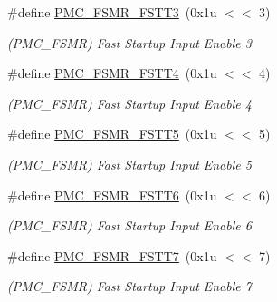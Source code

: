 \begin{DoxyCompactItemize}
\#define \mbox{\hyperlink{group__SAMV71__PMC_ga209ebf830fe0d38dec72a4157c8c0285}{P\+M\+C\+\_\+\+F\+S\+M\+R\+\_\+\+F\+S\+T\+T3}}~(0x1u $<$$<$ 3)
\begin{DoxyCompactList}\small\item\em (P\+M\+C\+\_\+\+F\+S\+MR) Fast Startup Input Enable 3 \end{DoxyCompactList}\item 
\mbox{\label{group__SAMV71__PMC_ga6ca1b1aa6cc30dfe611abc2f68c1225f}} 
\#define \mbox{\hyperlink{group__SAMV71__PMC_ga6ca1b1aa6cc30dfe611abc2f68c1225f}{P\+M\+C\+\_\+\+F\+S\+M\+R\+\_\+\+F\+S\+T\+T4}}~(0x1u $<$$<$ 4)
\begin{DoxyCompactList}\small\item\em (P\+M\+C\+\_\+\+F\+S\+MR) Fast Startup Input Enable 4 \end{DoxyCompactList}\item 
\mbox{\label{group__SAMV71__PMC_ga9bac35f07a6ff0faaf033f61b161f936}} 
\#define \mbox{\hyperlink{group__SAMV71__PMC_ga9bac35f07a6ff0faaf033f61b161f936}{P\+M\+C\+\_\+\+F\+S\+M\+R\+\_\+\+F\+S\+T\+T5}}~(0x1u $<$$<$ 5)
\begin{DoxyCompactList}\small\item\em (P\+M\+C\+\_\+\+F\+S\+MR) Fast Startup Input Enable 5 \end{DoxyCompactList}\item 
\mbox{\label{group__SAMV71__PMC_ga3b6da1895ec35cc9df97901ed644ecdb}} 
\#define \mbox{\hyperlink{group__SAMV71__PMC_ga3b6da1895ec35cc9df97901ed644ecdb}{P\+M\+C\+\_\+\+F\+S\+M\+R\+\_\+\+F\+S\+T\+T6}}~(0x1u $<$$<$ 6)
\begin{DoxyCompactList}\small\item\em (P\+M\+C\+\_\+\+F\+S\+MR) Fast Startup Input Enable 6 \end{DoxyCompactList}\item 
\mbox{\label{group__SAMV71__PMC_gaf4ff7e1da5eae4aac4516b218b6c82b3}} 
\#define \mbox{\hyperlink{group__SAMV71__PMC_gaf4ff7e1da5eae4aac4516b218b6c82b3}{P\+M\+C\+\_\+\+F\+S\+M\+R\+\_\+\+F\+S\+T\+T7}}~(0x1u $<$$<$ 7)
\begin{DoxyCompactList}\small\item\em (P\+M\+C\+\_\+\+F\+S\+MR) Fast Startup Input Enable 7 \end{DoxyCompactList}\item 
$$
\end{DoxyCompactItemize}
